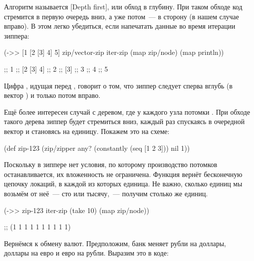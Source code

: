 Алгоритм называется [Depth first],
или обход в глубину. При таком обходе код стремится в первую очередь вниз, а уже
потом~--- в сторону (в нашем случае вправо). В этом легко убедиться, если
напечатать данные во время итерации зиппера:

\begin{english}
  \begin{clojure/lines}
(->> [1 [2 [3] 4] 5]
     zip/vector-zip
     iter-zip
     (map zip/node)
     (map println))

;; 1
;; [2 [3] 4]
;; 2
;; [3]
;; 3
;; 4
;; 5
  \end{clojure/lines}
\end{english}

Цифра , идущая перед  , говорит о том, что
зиппер следует сперва вглубь (в вектор \code{[3]}) и только потом вправо.

Ещё более интересен случай с деревом, где у каждого узла потомки \code{[1 2 3]}. При
обходе такого дерева зиппер будет стремиться вниз, каждый раз спускаясь в
очередной вектор \code{[1 2 3]} и становясь на единицу. Покажем это на схеме:

\begin{english}
  \begin{clojure}
(def zip-123
  (zip/zipper any?
              (constantly (seq [1 2 3]))
              nil
              1))
  \end{clojure}
\end{english}

\begin{figure}[H]
  \centering
  
  \label{fig:chart-zip-17}
\end{figure}

Поскольку в зиппере нет условия, по которому производство потомков
останавливается, их вложенность не ограничена. Функция  вернёт
бесконечную цепочку локаций, в каждой из которых единица. Не важно, сколько
единиц мы возьмём от неё~--- сто или тысячу,~--- получим столько же единиц.

\begin{english}
  \begin{clojure}
(->> zip-123
     iter-zip
     (take 10)
     (map zip/node))

;; (1 1 1 1 1 1 1 1 1 1)
  \end{clojure}
\end{english}

Вернёмся к обмену валют. Предположим, банк меняет рубли на доллары, доллары на
евро и евро на рубли. Выразим это в коде:

